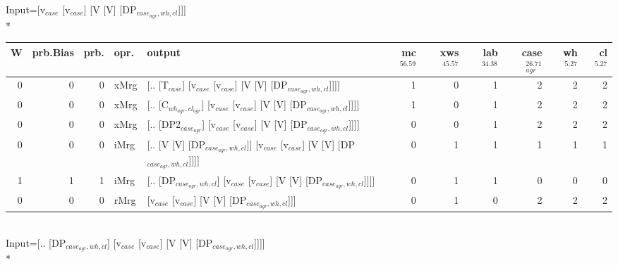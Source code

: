 \begingroup\scriptsize Input=[v$_{case}$ [v$_{case}$] [V [V] [DP$_{case_{agr},wh,cl}$]]]\\*
\begin{tabularx}{\linewidth}{rrrlXrrrrrr}
\hline
   W &   prb.Bias &   prb. & opr.   & output                                                                         &   mc$^{56.59}$ &   xws$^{45.57}$ &   lab$^{34.38}$ &   case$_{agr}^{26.71}$ &   wh$^{5.27}$ &   cl$^{5.27}$ \\
\hline
   0 &       0 &   0 & xMrg & [.. [T$_{case}$] [v$_{case}$ [v$_{case}$] [V [V] [DP$_{case_{agr},wh,cl}$]]]]                    &            1 &             0 &             1 &                  2 &           2 &           2 \\
   0 &       0 &   0 & xMrg & [.. [C$_{wh_{agr},cl_{agr}}$] [v$_{case}$ [v$_{case}$] [V [V] [DP$_{case_{agr},wh,cl}$]]]]           &            1 &             0 &             1 &                  2 &           2 &           2 \\
   0 &       0 &   0 & xMrg & [.. [DP2$_{case_{agr}}$] [v$_{case}$ [v$_{case}$] [V [V] [DP$_{case_{agr},wh,cl}$]]]]              &            0 &             0 &             1 &                  2 &           2 &           2 \\
   0 &       0 &   0 & iMrg & [.. [V [V] [DP$_{case_{agr},wh,cl}$]] [v$_{case}$ [v$_{case}$] [V [V] [DP$_{case_{agr},wh,cl}$]]]] &            0 &             1 &             1 &                  1 &           1 &           1 \\
   1 &       1 &   1 & iMrg & [.. [DP$_{case_{agr},wh,cl}$] [v$_{case}$ [v$_{case}$] [V [V] [DP$_{case_{agr},wh,cl}$]]]]         &            0 &             1 &             1 &                  0 &           0 &           0 \\
   0 &       0 &   0 & rMrg & [v$_{case}$ [v$_{case}$] [V [V] [DP$_{case_{agr},wh,cl}$]]]                                  &            0 &             1 &             0 &                  2 &           2 &           2 \\
\hline
\end{tabularx}\endgroup\\
\begingroup\scriptsize Input=[.. [DP$_{case_{agr},wh,cl}$] [v$_{case}$ [v$_{case}$] [V [V] [DP$_{case_{agr},wh,cl}$]]]]\\*
